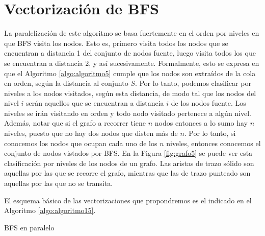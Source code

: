 \section{Vectorización de BFS}

La paralelización de este algoritmo se basa fuertemente en el orden por niveles en que BFS visita los nodos. Esto es, primero visita todos los nodos que se encuentran a distancia 1 del conjunto de nodos fuente, luego visita todos los que se encuentran a distancia 2, y así sucesivamente. Formalmente, esto se expresa en que el Algoritmo \ref{algo:algoritmo5} cumple que los nodos son extraídos de la cola en orden, según la distancia al conjunto $S$. Por lo tanto, podemos clasificar por niveles a los nodos visitados, según esta distancia, de modo tal que los nodos del nivel $i$ serán aquellos que se encuentran a distancia $i$ de los nodos fuente. Los niveles se irán visitando en orden y todo nodo visitado pertenece a algún nivel. Además, notar que si el grafo a recorrer tiene $n$ nodos entonces a lo sumo hay $n$ niveles, puesto que no hay dos nodos que disten más de $n$. Por lo tanto, si conocemos los nodos que ocupan cada uno de los $n$ niveles, entonces conocemos el conjunto de nodos vistados por BFS. En la Figura \ref{fig:grafo5} se puede ver esta clasificación por niveles de los nodos de un grafo. Las aristas de trazo sólido son aquellas por las que se recorre el grafo, mientras que las de trazo punteado son aquellas por las que no se transita.

El esquema básico de las vectorizaciones que propondremos es el indicado en el Algoritmo \ref{algo:algoritmo15}.

\begin{algorithm}
	\dontprintsemicolon
 	\BlankLine
\caption{BFS en paralelo}
\label{algo:algoritmo15}
\end{algorithm}


